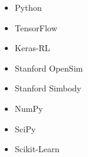 
\begin{itemize}
    \item {Python}
    \item {TensorFlow}
    \item {Keras-RL}
    \item {Stanford OpenSim}
    \item {Stanford Simbody}
    \item {NumPy}
    \item {SciPy}
    \item {Scikit-Learn}
\end{itemize}
